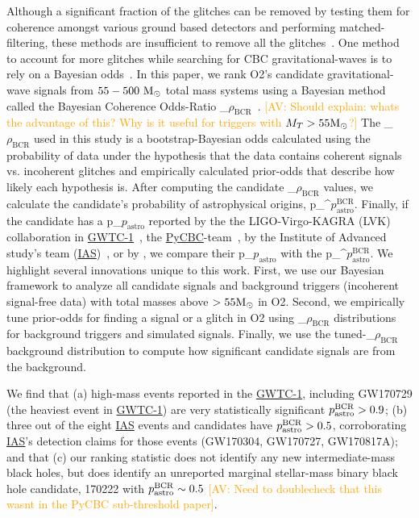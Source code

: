 \documentclass[%
 nofootinbib,
 amsmath,amssymb,
 aps,
 twocolumn,
 superscriptaddress
]{revtex4-2}
\newcommand{\pycbc}{{\sc \href{https://pycbc.org/}{{PyCBC}}}\xspace}
\newcommand{\GWTC}{{\sc \href{https://ui.adsabs.harvard.edu/abs/2019PhRvX...9c1040A/abstract}{{GWTC-1}}}\xspace}
\newcommand{\IAS}{{\sc \href{https://ui.adsabs.harvard.edu/abs/2020PhRvD.101h3030V/abstract}{{IAS}}}\xspace}
\newcommand{\fancytext}[1]{{\relax\ifmmode#1\else $#1$\fi}\xspace}
\newcommand{\mathcmd}[1]{{\sc \relax\ifmmode#1\else $#1$\fi}\xspace}
\newcommand{\bcr}{\mathcmd{\rho_\text{BCR}}}
\newcommand{\msun}{\mathcmd{\text{M}_\odot}}
\newcommand{\pastro}{\fancytext{p_\text{astro}}}
\newcommand{\pastrobcr}{\fancytext{p_\text{astro}^{\text{BCR}}}}
\newcommand{\avi}[1]{\textcolor{orange}{[AV: #1]}}
\begin{document}
Although a significant fraction of the glitches can be removed by testing them for coherence amongst various ground based detectors and performing matched-filtering, these methods are insufficient to remove all the glitches~\cite{ pycbc_short_duration_transients, pe_with_glitch, blip_glitches}. One method to account for more glitches while searching for CBC gravitational-waves is to rely on a Bayesian odds~\cite{bci, kanner2016leveraging, BCR1, BCR2, bcr_gw151216, bayesian_odds}. In this paper, we rank O2's candidate gravitational-wave signals from $55-500\ \msun$ total mass systems using a Bayesian method called the Bayesian Coherence Odds-Ratio \bcr~\cite{BCR1}. \avi{Should explain: whats the advantage of this? Why is it useful for triggers with $M_T>55\msun$?} The \bcr used in this study is a bootstrap-Bayesian odds calculated using the probability of data under the hypothesis that the data contains coherent signals vs. incoherent glitches and empirically calculated prior-odds that describe how likely each hypothesis is. After computing the candidate \bcr values, we calculate the candidate's probability of astrophysical origins, \pastrobcr. Finally, if the candidate has a \pastro reported by the the LIGO-Virgo-KAGRA (LVK) collaboration in \GWTC~\cite{GWTC1}, the \pycbc-team~\cite{pycbc_code, pycbc_og0, pycbc_og1, pycbc_og2, pycbc_og3, pycbc_og4, pycbc_og5, pycbc_og6, pycbc_single_det, pycbc_ogc_2}, by the Institute of Advanced study's team (\IAS)~\cite{IAS0, IAS1, IAS2}, or by \citet{bayesian_odds}, we compare their \pastro with the \pastrobcr.  We highlight several innovations unique to this work. First, we use our Bayesian framework to analyze all candidate signals and background triggers (incoherent signal-free data) with total masses above $> 55 \msun$ in O2. Second, we empirically tune prior-odds for finding a signal or a glitch in O2 using \bcr distributions for background triggers and simulated signals. Finally,  we use the tuned-\bcr background distribution to compute how significant candidate signals are from the background. 

We find that (a) high-mass events reported in the \GWTC, including GW170729 (the heaviest event in \GWTC) are very statistically significant $\pastrobcr>0.9$; (b) three out of the eight \IAS events and candidates have $\pastrobcr>0.5$, corroborating \IAS's detection claims for those events (GW170304, GW170727, GW170817A); and that (c) our ranking statistic does not identify any new intermediate-mass black holes, but does identify an unreported marginal stellar-mass binary black hole candidate, 170222 with $\pastrobcr\sim0.5$ \avi{Need to doublecheck that this wasnt in the PyCBC sub-threshold paper}. 
\end{document}
